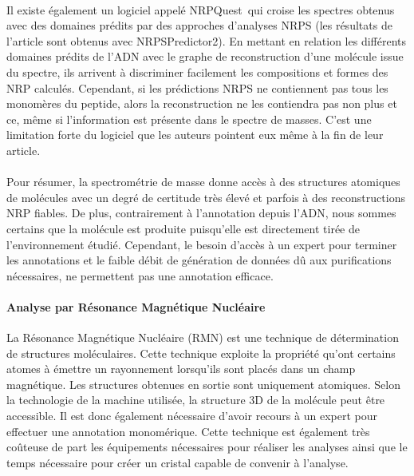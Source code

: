 \documentclass[12pt,french,twoside]{report}
\begin{document}
\paragraph{}Il existe également un logiciel appelé NRPQuest~\cite{mohimani_nrpquest:_2014}qui croise les spectres obtenus avec des domaines prédits par des approches d'analyses NRPS (les résultats de l'article sont obtenus avec NRPSPredictor2).
En mettant en relation les différents domaines prédits de l'ADN avec le graphe de reconstruction d'une molécule issue du spectre, ils arrivent à discriminer facilement les compositions et formes des NRP calculés.
Cependant, si les prédictions NRPS ne contiennent pas tous les monomères du peptide, alors la reconstruction ne les contiendra pas non plus et ce, même si l'information est présente dans le spectre de masses.
C'est une limitation forte du logiciel que les auteurs pointent eux même à la fin de leur article.

\paragraph{}Pour résumer, la spectrométrie de masse donne accès à des structures atomiques de molécules avec un degré de certitude très élevé et parfois à des reconstructions NRP fiables.
De plus, contrairement à l'annotation depuis l'ADN, nous sommes certains que la molécule est produite puisqu'elle est directement tirée de l'environnement étudié.
Cependant, le besoin d'accès à un expert pour terminer les annotations et le faible débit de génération de données dû aux purifications nécessaires, ne permettent pas une annotation efficace.


\paragraph{Analyse par Résonance Magnétique Nucléaire}
La Résonance Magnétique Nucléaire (RMN) est une technique de détermination de structures moléculaires.
Cette technique exploite la propriété qu'ont certains atomes à émettre un rayonnement lorsqu'ils sont placés dans un champ magnétique.
Les structures obtenues en sortie sont uniquement atomiques.
Selon la technologie de la machine utilisée, la structure 3D de la molécule peut être accessible.
Il est donc également nécessaire d'avoir recours à un expert pour effectuer une annotation monomérique.
Cette technique est également très coûteuse de part les équipements nécessaires pour réaliser les analyses ainsi que le temps nécessaire pour créer un cristal capable de convenir à l'analyse.
\end{document}
